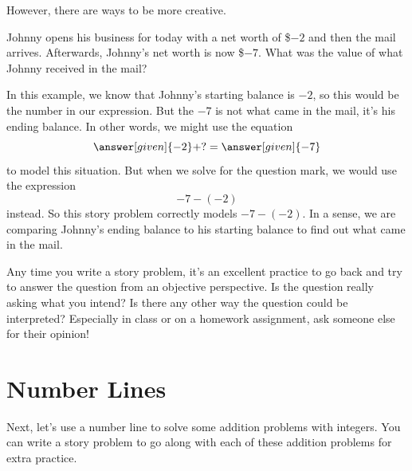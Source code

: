 \documentclass{ximera}
\begin{document}
However, there are ways to be more creative. 


\begin{question}
Johnny opens his business for today with a net worth of \$$-2$ and then the mail arrives.  Afterwards, 
Johnny's net worth is now \$$-7$.  What was the value of what Johnny received in the mail?

\begin{explanation}
In this example, we know that Johnny's starting balance is $-2$, so this would be the  number in our expression. But the $-7$ is not what came in the mail, it's his ending balance. In other words, we might use the equation
\[
\answer[given]{-2} + ? = \answer[given]{-7}
\]
to model this situation. But when we solve for the question mark, we would use the expression
\[
-7 - (-2)
\]
instead. So this story problem correctly models $-7-(-2)$. In a sense, we are comparing Johnny's ending balance to his starting balance to find out what came in the mail.
\end{explanation}
\end{question}

Any time you write a story problem, it's an excellent practice to go back and try to answer the question from an objective perspective.  Is the question really asking what you intend?  Is there any other way the question could be interpreted?  Especially in class or on a homework assignment, ask someone else for their opinion!


\section{Number Lines}

Next, let's use a number line to solve some addition problems with integers.  You can write a story problem to go along with each of these addition problems for extra practice.
\end{document}
